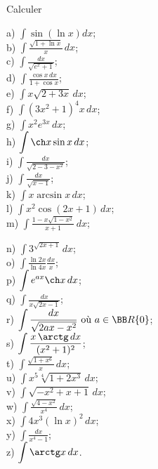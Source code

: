 \documentclass[12pt,french,oneside,a4paper]{memoir} %
\begin{document}
\begin{exo}
Calculer\\[2mm]

\hfill
\begin{minipage}[t]{6cm}
a) $\displaystyle{\int\sin(\ln x)dx}$;\\[2mm]
b) $\displaystyle{\int \frac{\sqrt{1+\ln x}}{x}\,dx}$;\\[2mm]
c) $\displaystyle{\int\frac{dx}{\sqrt{e^x+1}}}$;\\[2mm]
d) $\displaystyle{\int\frac{\cos x\,dx}{1+\cos x}}$;\\[2mm]
e) $\displaystyle{\int x\sqrt{2+3x}\,dx}$;\\[2mm]
f) $\displaystyle{\int(3x^2+1)^4x\,dx}$;\\[2mm]
g) $\displaystyle{\int x^2e^{3x}\,dx}$;\\[2mm]
h) $\displaystyle{\int\ch x\sin x\,dx}$;\\[2mm]
i) $\displaystyle{\int\frac{dx}{\sqrt{2-3-x^2}}}$;\\[2mm]
j) $\displaystyle{\int\frac{dx}{\sqrt{x-1}}}$;\\[2mm]
k) $\displaystyle{\int x \arcsin x\,dx}$;\\[2mm]
l) $\displaystyle{\int x^2\cos(2x+1)\,dx}$;\\[2mm]
m) $\displaystyle{\int\frac{1-x\sqrt{1-x^2}}{x+1}\,dx}$;\\[2mm]
\end{minipage}
\hfill
\begin{minipage}[t]{8cm}
n) $\displaystyle{\int 3^{\sqrt{2x+1}}\,dx}$;\\[2mm]
o) $\displaystyle{\int\frac{\ln 2x}{\ln
4x}\frac{dx}{x}}$;\\[2mm]
p) $\displaystyle{\int e^{ax}\ch x\,dx}$;\\[2mm]
q) $\displaystyle{\int \frac{dx}{x\sqrt{2x-1}}}$;\\[2mm]
r) $\displaystyle{\int \frac{dx}{\sqrt{2ax-x^2}}}\mbox{ où
}a\in{\BB R}\{0\}$;\\[2mm] 
s) $\displaystyle{\int \frac{x\,\arctg
\,dx}{(x^2+1)^2}}$;\\[2mm] 
t) $\displaystyle{\int
\frac{\sqrt{1+x^6}}{x}\,dx}$;\\[2mm] 
u) $\displaystyle{\int
x^5\sqrt[4]{1+2x^3}\,dx}$;\\[2mm] 
v) $\displaystyle{\int
\sqrt{-x^2+x+1}\,dx}$;\\[2mm] w) $\displaystyle{\int
\frac{\sqrt{4-x^2}}{x^4}\,dx}$;\\[2mm] x) $\displaystyle{\int
4x^3(\ln x)^2\,dx}$;\\[2mm] y) $\displaystyle{\int
\frac{dx}{x^4-1}}$;\\[2mm] z) $\displaystyle{\int \arctg
x\,dx}$.\\[2mm] \end{minipage}
\hfill
\end{exo}
\end{document}

